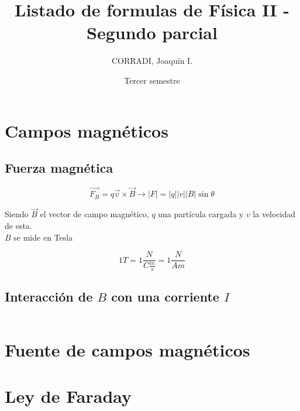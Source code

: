\documentclass[a4, 12pt]{report}
\title{Listado de formulas de Física II - Segundo parcial}
\date{Tercer semestre}
\author{CORRADI, Joaquín I.}
\begin{document}
  \maketitle
  \setcounter{tocdepth}{5}
  \tableofcontents
  \newpage

  \chapter*{Campos magnéticos}

    \section*{Fuerza magnética}
      
      \begin{equation*}
        \vec{F_B}=q\vec{v}\times\vec{B}\longrightarrow |F|=|q||v||B|\sin{\theta}
      \end{equation*}

      Siendo $\vec{B}$ el vector de campo magnético, $q$ una partícula cargada
      y $v$ la velocidad de esta.\\
      \indent$B$ se mide en Tesla

      \begin{equation*}
        1T=1\frac{N}{C\frac{m}{s}}=1\frac{N}{Am}
      \end{equation*}

    \section*{Interacción de $B$ con una corriente $I$}

      \begin{equation*}
        
      \end{equation*}

  \chapter*{Fuente de campos magnéticos}

  \chapter*{Ley de Faraday}
\end{document}
